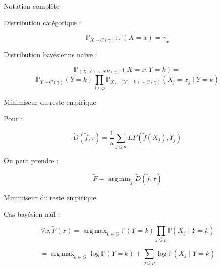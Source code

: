 \documentclass[11pt]{beamer}
\DeclareMathOperator*{\argmax}{arg\,max}
\DeclareMathOperator*{\argmin}{arg\,min}
\begin{document}
\begin{frame}{Notation complète}

Distribution catégorique :

$$\mathbb{P}_{X\sim C(\gamma)}: \mathbb{P}(X=x) = \gamma_x$$

Distribution bayésienne naïve :

$$\mathbb{P}_{(X,Y)\sim NB(\gamma)}(X=x,Y=k) =$$
$$ \mathbb{P}_{Y\sim C(\gamma)}(Y=k) \prod_{j\leq p} \mathbb{P}_{X_j\mid (Y=k)\sim C(\gamma)}(X_j=x_j\mid Y=k)$$ 

\end{frame}

\begin{frame}{Minimiseur du reste empirique}

Pour :

$$\tilde{D}(\tilde{f},\tau) = \frac{1}{n}\sum_{j \leq n} LF(\tilde{f}(X_j),Y_j)$$

On peut prendre :

$$\tilde{F} = \argmin_{\tilde{f}} \tilde{D}(\tilde{f},\tau)$$

\end{frame}

\begin{frame}{Minimiseur du reste empirique}

Cas bayésien naïf :

$$\forall x, \tilde{F}(x) = \argmax_{k \in G} \mathbb{P}(Y=k)\prod_{j \leq p} \mathbb{P}(X_j\mid Y=k)$$

\pause

$$= \argmax_{k \in G} \log\mathbb{P}(Y=k) + \sum_{j \leq p} \log\mathbb{P}(X_j\mid Y=k)$$

\end{frame}
\end{document}
